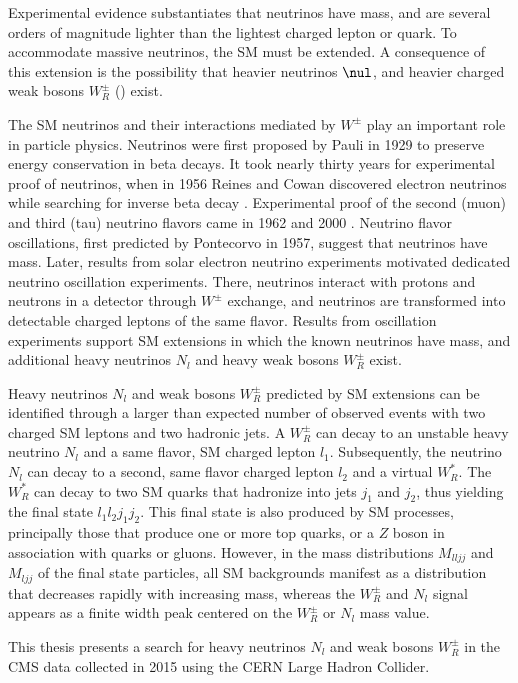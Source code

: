 Experimental evidence \cite{NOvAresults,mainzPhaseIIResults,t2kResults} 
substantiates that neutrinos have mass, and are several orders of magnitude lighter than the lightest charged 
lepton or quark.  To accommodate massive neutrinos, the SM must be extended.  A consequence of this extension is the 
possibility that heavier neutrinos $\nul$, and heavier charged weak bosons $W^{\pm}_{R}$ (\WR) exist.

The SM neutrinos and their interactions mediated by $W^{\pm}$ play an important role in particle 
physics.  Neutrinos were first proposed by Pauli in 1929 to preserve energy conservation in beta decays.  It took 
nearly thirty years for experimental proof of neutrinos, when in 1956 Reines and Cowan discovered electron neutrinos while 
searching for inverse beta decay \cite{firstNuDiscovery}.  Experimental proof of the second (muon) and third (tau) neutrino flavors came in 
1962 \cite{muNuDiscovery} and 2000 \cite{tauNuDiscovery}.  Neutrino flavor oscillations, first predicted by Pontecorvo in 1957, suggest that 
neutrinos have mass.  Later, results from solar electron neutrino experiments \cite{kamiokandeTwo,solarNuSummary} motivated 
dedicated neutrino oscillation experiments.  There, neutrinos interact with protons and neutrons in a detector through 
$W^{\pm}$ exchange, and neutrinos are transformed into detectable charged leptons of the same flavor.  Results from 
oscillation experiments support SM extensions in which the known neutrinos have mass, and additional heavy neutrinos 
$N_{l}$ and heavy weak bosons $W^{\pm}_{R}$ exist.

Heavy neutrinos $N_{l}$ and weak bosons $W^{\pm}_{R}$ predicted by SM extensions can be identified through a larger 
than expected number of observed events with two charged SM leptons and two hadronic jets.  A $W^{\pm}_{R}$ can 
decay to an unstable heavy neutrino $N_{l}$ and a same flavor, SM charged lepton $l_{1}$.  Subsequently, the 
neutrino $N_{l}$ can decay to a second, same flavor charged lepton $l_{2}$ and a virtual $W^{*}_{R}$.  The $W^{*}_{R}$ can 
decay to two SM quarks that hadronize into jets $j_{1}$ and $j_{2}$, thus yielding the final state $l_{1}l_{2}j_{1}j_{2}$.  
This final state is also produced by SM processes, principally those that produce one or more top quarks, or 
a $Z$ boson in association with quarks or gluons.  However, in the mass distributions $M_{lljj}$ and $M_{ljj}$ 
of the final state particles, all SM backgrounds manifest as a distribution that decreases rapidly with increasing 
mass, whereas the $W^{\pm}_{R}$ and $N_{l}$ signal appears as a finite width peak centered on the $W^{\pm}_{R}$ 
or $N_{l}$ mass value.

This thesis presents a search for heavy neutrinos $N_{l}$ and weak bosons $W^{\pm}_{R}$ in the CMS data collected 
in 2015 using the CERN Large Hadron Collider.

